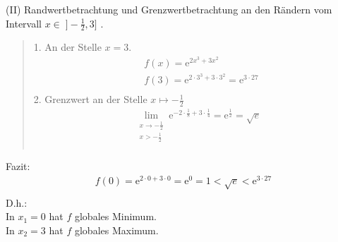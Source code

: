 (II) Randwertbetrachtung und Grenzwertbetrachtung an den Rändern vom Intervall  $ x\in\;]-\frac{1}{2},3] $ .\\
\begin{quote}
1. An der Stelle $ x=3 $.
\begin{align*}
&f(x)=\mathrm{e}^{2x^3+3x^2}\\
&f(3)=\mathrm{e}^{2\cdot3^3+3\cdot3^2}=\mathrm{e}^{3\cdot27}\\
\end{align*}
2. Grenzwert an der Stelle $ x\mapsto -\frac{1}{2} $
\begin{align*}
\lim\limits_ {\substack{x \to -\frac{1}{2} \\ x>-\frac{1}{2}}}\mathrm{e}^{-2\cdot \frac{1}{8}+3\cdot\frac{1}{4}}=\mathrm{e}^{\frac{1}{2}}=\sqrt{e}\\
\end{align*}
\end{quote}
Fazit:\\
\begin{align*}
f(0)=\mathrm{e}^{2\cdot 0+3\cdot 0}=\mathrm{e}^0=1<\sqrt{e}<\mathrm{e}^{3\cdot 27}\\
\end{align*}
D.h.:\\
In $ x_1=0 $ hat $ f $ globales Minimum.\\
In $ x_2=3 $ hat $ f $ globales Maximum.
